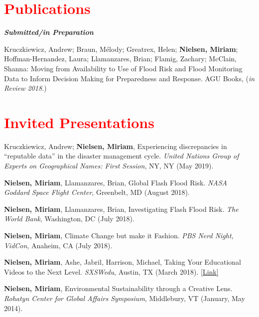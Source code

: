 \documentclass[margin, line, palatino, courier, 10pt]{res}
\begin{document}
\begin{resume}
\begin{tabular}{@{}p{1 in}p{4in}}
\end{tabular}



\section{\sc \large{\textcolor{Red}{Publications}}}

\textit{\textbf{Submitted/in Preparation}}
\vspace*{-0.1in}\\
\begin{etaremune}[leftmargin=.2in,topsep=0in,parsep=0in]
\item Kruczkiewicz, Andrew; Braun, Mélody; Greatrex, Helen; \textbf{Nielsen, Miriam}; \\ Hoffman-Hernandez, Laura; Llamanzares, Brian; Flamig, Zachary; McClain, Shanna: Moving from Availability to Use of Flood Risk and Flood Monitoring Data to Inform Decision Making for Preparedness and Response. AGU Books, (\textit{in Review 2018.})
\end{etaremune}

\section{\sc \textcolor{Red}{\large{Invited Presentations}}}
\begin{etaremune}[leftmargin=.2in,topsep=0in,parsep=0in]
\item  Kruczkiewicz, Andrew; \textbf{Nielsen, Miriam},  Experiencing discrepancies in “reputable data” in the disaster management cycle. \textit{United Nations Group of Experts on Geographical Names: First Session}, NY, NY (May 2019). 
\item  \textbf{Nielsen, Miriam}, Llamanzares, Brian, Global Flash Flood Risk. \textit{NASA Goddard Space Flight Center}, Greenbelt, MD (August 2018). 
\item  \textbf{Nielsen, Miriam}, Llamanzares, Brian, Investigating Flash Flood Risk. \textit{The World Bank}, Washington, DC (July 2018). 
\item  \textbf{Nielsen, Miriam}, Climate Change but make it Fashion. \textit{PBS Nerd Night, VidCon}, Anaheim, CA (July 2018).
\item  \textbf{Nielsen, Miriam}, Ashe, Jabril, Harrison, Michael, Taking Your Educational Videos to the Next Level. \textit{SXSWedu}, Austin, TX (March 2018). \href{https://schedule.sxswedu.com/2018/events/PP76461"}{[Link]}
\item  \textbf{Nielsen, Miriam}, Environmental Sustainability through a Creative Lens. \textit{Rohatyn Center for Global Affairs Symposium}, Middlebury, VT (January, May 2014). 
\end{etaremune}




\end{resume}
\end{document}
